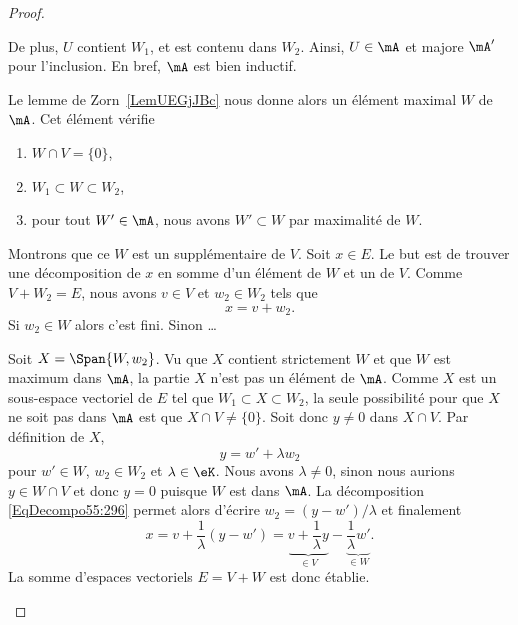 \begin{proof}
\begin{subproof}
		De plus, \( U \) contient \( W_1 \), et est contenu dans \( W_2\). Ainsi, \( U\in \mA\) et majore \( \mA'\) pour l'inclusion. En bref, \( \mA\) est bien inductif.

		Le lemme de Zorn~\ref{LemUEGjJBc} nous donne alors un élément maximal \( W\) de \( \mA\). Cet élément vérifie
		\begin{enumerate}
			\item
			      \( W\cap V=\{ 0 \}\),
			\item
			      \( W_1\subset W\subset W_2\),
			\item
			      pour tout \( W'\in\mA\), nous avons \( W'\subset W\) par maximalité de \( W\).
		\end{enumerate}

		\spitem[Supplémentaire]
		Montrons que ce \( W\) est un supplémentaire de \( V\). Soit \( x\in E\). Le but est de trouver une décomposition de \( x\) en somme d'un élément de \( W\) et un de \( V\). Comme \( V+W_2=E\), nous avons \( v\in V\) et \( w_2\in W_2\) tels que
		\begin{equation}
			x=v+w_2.
		\end{equation}
		Si \( w_2\in W\) alors c'est fini. Sinon \ldots

		Soit \( X=\Span\{ W,w_2 \}\). Vu que \( X\) contient strictement \( W\) et que \( W\) est maximum dans \( \mA\), la partie \( X\) n'est pas un élément de \( \mA\). Comme \( X\) est un sous-espace vectoriel de \( E\) tel que \( W_1\subset X\subset W_2\), la seule possibilité pour que \( X\) ne soit pas dans \( \mA\) est que \( X\cap V\neq \{ 0 \}\). Soit donc \( y\neq 0\) dans \( X\cap V\). Par définition de \( X\),
		\begin{equation}      \label{EqDecompo55:296}
			y=w'+\lambda w_2
		\end{equation}
		pour \( w'\in W\), \( w_2\in W_2\) et \( \lambda\in \eK\). Nous avons \( \lambda\neq 0\), sinon nous aurions \( y\in W\cap V \) et donc \(y = 0 \) puisque \( W \) est dans \( \mA \). La décomposition \eqref{EqDecompo55:296} permet alors d'écrire \( w_2=(y-w')/\lambda\) et finalement
		\begin{equation}
			x=v+\frac{1}{ \lambda }(y-w')=\underbrace{v+\frac{1}{ \lambda }y}_{\in V}-\underbrace{\frac{1}{ \lambda }w'}_{\in W}.
		\end{equation}
		La somme d'espaces vectoriels \( E=V+W\) est donc établie.
	\end{subproof}
\end{proof}

